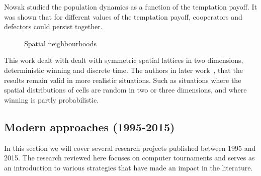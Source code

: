 \documentclass{article}
\theoremstyle{definition}
\begin{document}
Nowak studied the population dynamics as a function of the temptation payoff.
It was shown that for different values of the temptation payoff, cooperators
and defectors could persist together.

\begin{figure}[!hbtp]
\centering
    \begin{subfigure}{.25\textwidth}
        \hspace{.8cm}
        
    \end{subfigure}
    \begin{subfigure}{.25\textwidth}\centering
        
     \end{subfigure}
     \begin{subfigure}{.25\textwidth}\centering
        
     \end{subfigure}
    \begin{subfigure}{.25\textwidth}
        
    \end{subfigure}
    \begin{subfigure}{.25\textwidth}\centering
        
     \end{subfigure}
     \begin{subfigure}{.25\textwidth}\centering
        
     \end{subfigure}
     \caption{Spatial neighbourhoods}\label{fig:topologies}
    \end{figure}

This work dealt with dealt with symmetric spatial lattices in two dimensions,
deterministic winning and discrete time. The authors in later work~\cite{nowak1994},
that the results remain valid in more realistic situations. Such as situations
where the spatial distributions of cells are random in two or three dimensions,
and where winning is partly probabilistic.

\subsection{Modern approaches (1995-2015)}\label{section:modern_approaches}

In this section we will cover several research projects published between 1995
and 2015. The research reviewed here focuses on computer tournaments and serves
as an introduction to various strategies that have made an impact in the literature.
\end{document}
